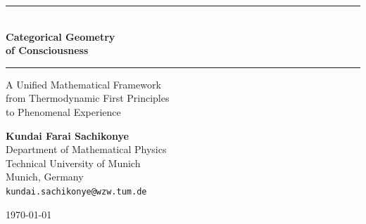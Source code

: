 \begin{titlepage}
\centering
\vspace*{2cm}

{\sffamily\color{themeblue}
  \rule{\linewidth}{0.5pt}\\[0.4cm]
  {\fontsize{28}{34}\selectfont\bfseries
    Categorical Geometry\\[0.2em]
    of Consciousness
  }\\[0.4cm]
  \rule{\linewidth}{0.5pt}
}

\vspace{1.5cm}

{\Large\sffamily\color{themegray}
  A Unified Mathematical Framework\\[0.3em]
  from Thermodynamic First Principles\\[0.3em]
  to Phenomenal Experience
}

\vspace{3cm}

{\large\sffamily
  \textbf{Kundai Farai Sachikonye}\\[0.5em]
  \normalsize\color{themegray}
  Department of Mathematical Physics\\
  Technical University of Munich\\
  Munich, Germany\\[0.3em]
  \texttt{kundai.sachikonye@wzw.tum.de}
}

\vfill

{\sffamily\color{themegray}
  \today
}

\end{titlepage}
